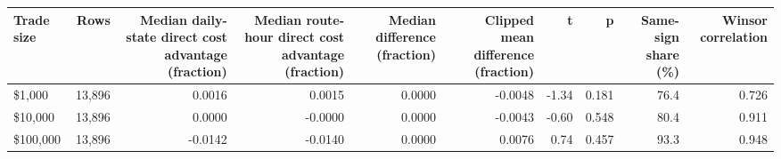 \begin{tabular}{lrrrrrrrrr}
\toprule
Trade size & Rows & Median daily-state direct cost advantage (fraction) & Median route-hour direct cost advantage (fraction) & Median difference (fraction) & Clipped mean difference (fraction) & t & p & Same-sign share (\%) & Winsor correlation \\
\midrule
\$1,000 & 13,896 & 0.0016 & 0.0015 & 0.0000 & -0.0048 & -1.34 & 0.181 & 76.4 & 0.726 \\
\$10,000 & 13,896 & 0.0000 & -0.0000 & 0.0000 & -0.0043 & -0.60 & 0.548 & 80.4 & 0.911 \\
\$100,000 & 13,896 & -0.0142 & -0.0140 & 0.0000 & 0.0076 & 0.74 & 0.457 & 93.3 & 0.948 \\
\bottomrule
\end{tabular}
